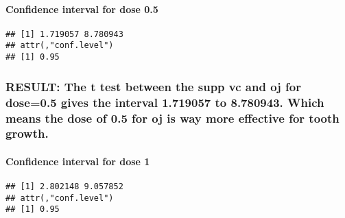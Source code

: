 \documentclass[]{article}
\newenvironment{Shaded}{\begin{snugshade}}{\end{snugshade}}
\newcommand{\KeywordTok}[1]{\textcolor[rgb]{0.13,0.29,0.53}{\textbf{#1}}}
\newcommand{\DataTypeTok}[1]{\textcolor[rgb]{0.13,0.29,0.53}{#1}}
\newcommand{\DecValTok}[1]{\textcolor[rgb]{0.00,0.00,0.81}{#1}}
\newcommand{\FloatTok}[1]{\textcolor[rgb]{0.00,0.00,0.81}{#1}}
\newcommand{\OperatorTok}[1]{\textcolor[rgb]{0.81,0.36,0.00}{\textbf{#1}}}
\newcommand{\NormalTok}[1]{#1}
\let\oldparagraph\paragraph
\renewcommand{\paragraph}[1]{\oldparagraph{#1}\mbox{}}
\begin{document}
\paragraph{Confidence interval for dose
0.5}\label{confidence-interval-for-dose-0.5}

\begin{Shaded}
\end{Shaded}

\begin{verbatim}
## [1] 1.719057 8.780943
## attr(,"conf.level")
## [1] 0.95
\end{verbatim}

\subsubsection{RESULT: The t test between the supp vc and oj for
dose=0.5 gives the interval 1.719057 to 8.780943. Which means the dose
of 0.5 for oj is way more effective for tooth
growth.}\label{result-the-t-test-between-the-supp-vc-and-oj-for-dose0.5-gives-the-interval-1.719057-to-8.780943.-which-means-the-dose-of-0.5-for-oj-is-way-more-effective-for-tooth-growth.}

\paragraph{Confidence interval for dose
1}\label{confidence-interval-for-dose-1}

\begin{Shaded}
\end{Shaded}

\begin{verbatim}
## [1] 2.802148 9.057852
## attr(,"conf.level")
## [1] 0.95
\end{verbatim}
\end{document}
